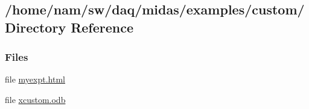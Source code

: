 \subsection{/home/nam/sw/daq/midas/examples/custom/ Directory Reference}
\label{dir_5110c29dda020bd4978fd5f040bdbd38}
\subsubsection*{Files}
\begin{DoxyCompactItemize}
\item 
file \hyperlink{myexpt_8html}{myexpt.html}
\item 
file \hyperlink{xcustom_8odb}{xcustom.odb}
\end{DoxyCompactItemize}
